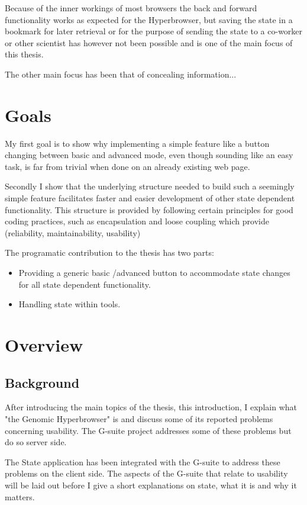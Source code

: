 \documentclass[english]{ifimaster}
\begin{document}
Because of the inner workings of most browsers the back and forward functionality works as expected for the Hyperbrowser, but saving the state in a bookmark for later retrieval or for the purpose of sending the state to a co-worker or other scientist has however not been possible and is one of the main focus of this thesis.

The other main focus has been that of concealing information...


\section{Goals}
My first goal is to show why implementing a simple feature like a button changing between basic and advanced mode, even though sounding like an easy task, is far from trivial when done on an already existing web page. 

Secondly I show that the underlying structure needed to build such a seemingly simple feature facilitates faster and easier development of other state dependent functionality. This structure is provided by following certain principles for good coding practices, such as encapsulation and loose coupling which provide (reliability, maintainability, usability)

The programatic contribution to the thesis has two parts:
\begin{itemize}
  \item Providing a generic basic /advanced button to accommodate state changes for all state dependent functionality.
  \item Handling state within tools. 
\end{itemize}

\section{Overview}
\subsection{Background}
After introducing the main topics of the thesis, this introduction, I explain what "the Genomic Hyperbrowser" is and discuss some of its reported problems concerning usability. The G-suite project addresses some of these problems but do so server side. 

The State application has been integrated with the G-suite to address these problems on the client side. The aspects of the G-suite that relate to usability will be laid out before I give a short explanations on state, what it is and why it matters. 
\end{document}
